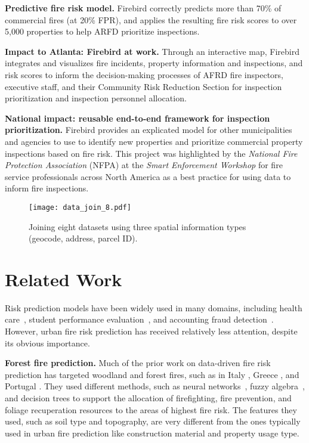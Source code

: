 \documentclass{sig-alternate-05-2015}
\begin{document}
{\begin{itemize*}
\item \textbf{Predictive fire risk model.} 
Firebird correctly predicts more than 70\% of commercial fires (at 20\% FPR), and applies the resulting fire risk scores to over 5,000 properties 
 to help ARFD prioritize inspections.

\item \textbf{Impact to Atlanta: Firebird at work.} 
Through an interactive map, Firebird integrates and visualizes fire incidents, property information and  inspections, and risk scores to inform the decision-making processes of AFRD fire inspectors, executive staff, and their Community Risk Reduction Section for inspection prioritization and inspection personnel allocation.

\item \textbf{National impact: reusable end-to-end framework for inspection prioritization.} 
Firebird provides an explicated model for other municipalities and agencies to use to identify new properties and prioritize commercial property inspections based on fire risk. 
This project was highlighted by the \textit{National Fire Protection Association} (NFPA) at the \textit{Smart Enforcement Workshop} for fire service professionals across North America as a best practice for using data to inform fire inspections.
\end{itemize*}


\begin{figure*}[!ht]
\centering
    \texttt{[image: data\_join\_8.pdf]}
\caption{Joining eight datasets using three spatial information types (geocode, address, parcel ID).}
\label{fig:joining}
\end{figure*}


\section{Related Work}
Risk prediction models have been widely used in many domains, including health care~\cite{kansagara2011risk}, student performance evaluation~\cite{lakkaraju2015machine}, and accounting fraud detection~\cite{mcglohon2009snare}. However, urban fire risk prediction has received relatively less attention, despite its obvious importance.

\textbf{Forest fire prediction.} Much of the prior work on data-driven fire risk prediction has targeted woodland and forest fires, such as in Italy \cite{lapucci05}, Greece \cite{iliadis05},  and Portugal \cite{de01}. They used different methods, such as neural networks~\cite{de01}, fuzzy algebra~\cite{iliadis05}, and decision trees \cite{lapucci05} to support the allocation of firefighting, fire prevention, and foliage recuperation resources to the areas of highest fire risk. The features they used, such as soil type and topography, are very different from the ones typically used in urban fire prediction like construction material and property usage type.

}
\end{document}
